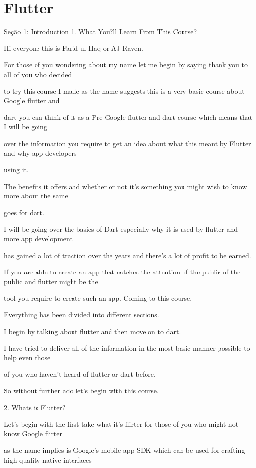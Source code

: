 \section{Flutter}

Seção 1: Introduction
1. What You?ll Learn From This Course?

Hi everyone this is Farid-ul-Haq or AJ Raven.

For those of you wondering about my name let me begin by saying thank you to all of you who decided

to try this course I made as the name suggests this is a very basic course about Google flutter and

dart you can think of it as a Pre Google flutter and dart course which means that I will be going

over the information you require to get an idea about what this meant by Flutter and why app developers

using it.

The benefits it offers and whether or not it's something you might wish to know more about the same

goes for dart.

I will be going over the basics of Dart especially why it is used by flutter and more app development

has gained a lot of traction over the years and there's a lot of profit to be earned.

If you are able to create an app that catches the attention of the public of the public and flutter might be the

tool you require to create such an app. Coming to this course.

Everything has been divided into different sections.

I begin by talking about flutter and then move on to dart.

I have tried to deliver all of the information in the most basic manner possible to help even those

of you who haven't heard of flutter or dart before.

So without further ado let's begin with this course.



2. Whats is Flutter?

Let's begin with the first take what it's flirter for those of you who might not know Google flirter

as the name implies is Google's mobile app SDK which can be used for crafting high quality native interfaces

